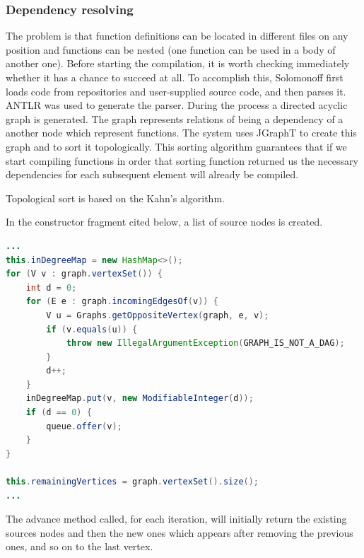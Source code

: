\hypertarget{dependency-resolving}{%
\subsubsection{Dependency resolving}\label{dependency-resolving}}

The problem is that function definitions can be located in different
files on any position and functions can be nested (one function can be
used in a body of another one). Before starting the compilation, it is
worth checking immediately whether it has a chance to succeed at all. To
accomplish this, Solomonoff first loads code from repositories and
user-supplied source code, and then parses it. ANTLR was used to
generate the parser. During the process a directed acyclic graph is
generated. The graph represents relations of being a dependency of a
another node which represent functions. The system uses JGraphT to
create this graph and to sort it topologically. This sorting algorithm
guarantees that if we start compiling functions in order that sorting
function returned us the necessary dependencies for each subsequent
element will already be compiled.

Topological sort is based on the Kahn's algorithm.

In the constructor fragment cited below, a list of source nodes is
created.

\begin{lstlisting}[language=Java, frame=single]
...
this.inDegreeMap = new HashMap<>();
for (V v : graph.vertexSet()) {
    int d = 0;
    for (E e : graph.incomingEdgesOf(v)) {
        V u = Graphs.getOppositeVertex(graph, e, v);
        if (v.equals(u)) {
            throw new IllegalArgumentException(GRAPH_IS_NOT_A_DAG);
        }
        d++;
    }
    inDegreeMap.put(v, new ModifiableInteger(d));
    if (d == 0) {
        queue.offer(v);
    }
}

this.remainingVertices = graph.vertexSet().size();
...
\end{lstlisting}

The advance method called, for each iteration, will initially return the
existing sources nodes and then the new ones which appears after
removing the previous ones, and so on to the last vertex.

